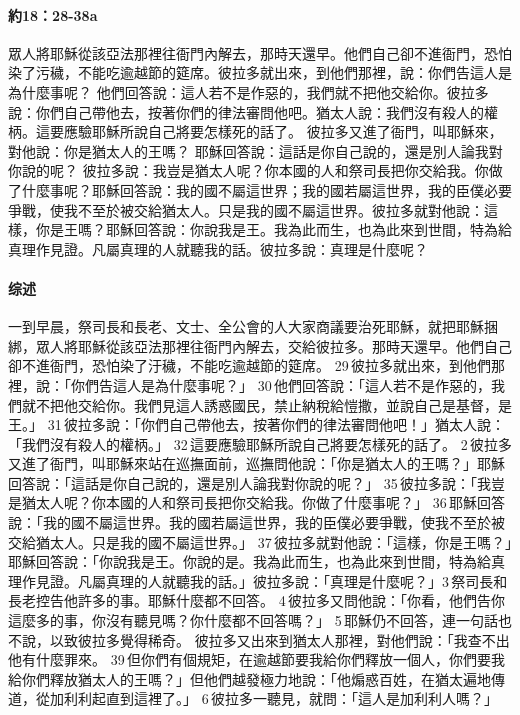 \paragraph{約18：28-38a}
眾人將耶穌從該亞法那裡往衙門內解去，那時天還早。他們自己卻不進衙門，恐怕染了污穢，不能吃逾越節的筵席。彼拉多就出來，到他們那裡，說：你們告這人是為什麼事呢？
他們回答說：這人若不是作惡的，我們就不把他交給你。彼拉多說：你們自己帶他去，按著你們的律法審問他吧。猶太人說：我們沒有殺人的權柄。這要應驗耶穌所說自己將要怎樣死的話了。
彼拉多又進了衙門，叫耶穌來，對他說：你是猶太人的王嗎？
耶穌回答說：這話是你自己說的，還是別人論我對你說的呢？
彼拉多說：我豈是猶太人呢？你本國的人和祭司長把你交給我。你做了什麼事呢？耶穌回答說：我的國不屬這世界；我的國若屬這世界，我的臣僕必要爭戰，使我不至於被交給猶太人。只是我的國不屬這世界。彼拉多就對他說：這樣，你是王嗎？耶穌回答說：你說我是王。我為此而生，也為此來到世間，特為給真理作見證。凡屬真理的人就聽我的話。彼拉多說：真理是什麼呢？
\paragraph{综述}
一到早晨，祭司長和長老、文士、全公會的人大家商議要治死耶穌，就把耶穌捆綁，眾人將耶穌從該亞法那裡往衙門內解去，交給彼拉多。那時天還早。他們自己卻不進衙門，恐怕染了汙穢，不能吃逾越節的筵席。 29 彼拉多就出來，到他們那裡，說：「你們告這人是為什麼事呢？」 30 他們回答說：「這人若不是作惡的，我們就不把他交給你。我們見這人誘惑國民，禁止納稅給愷撒，並說自己是基督，是王。」 31 彼拉多說：「你們自己帶他去，按著你們的律法審問他吧！」猶太人說：「我們沒有殺人的權柄。」 32 這要應驗耶穌所說自己將要怎樣死的話了。
 2 彼拉多又進了衙門，叫耶穌來站在巡撫面前，巡撫問他說：「你是猶太人的王嗎？」耶穌回答說：「這話是你自己說的，還是別人論我對你說的呢？」 35 彼拉多說：「我豈是猶太人呢？你本國的人和祭司長把你交給我。你做了什麼事呢？」 36 耶穌回答說：「我的國不屬這世界。我的國若屬這世界，我的臣僕必要爭戰，使我不至於被交給猶太人。只是我的國不屬這世界。」 37 彼拉多就對他說：「這樣，你是王嗎？」耶穌回答說：「你說我是王。你說的是。我為此而生，也為此來到世間，特為給真理作見證。凡屬真理的人就聽我的話。」彼拉多說：「真理是什麼呢？」3 祭司長和長老控告他許多的事。耶穌什麼都不回答。 4 彼拉多又問他說：「你看，他們告你這麼多的事，你沒有聽見嗎？你什麼都不回答嗎？」 5 耶穌仍不回答，連一句話也不說，以致彼拉多覺得稀奇。
彼拉多又出來到猶太人那裡，對他們說：「我查不出他有什麼罪來。 39 但你們有個規矩，在逾越節要我給你們釋放一個人，你們要我給你們釋放猶太人的王嗎？」但他們越發極力地說：「他煽惑百姓，在猶太遍地傳道，從加利利起直到這裡了。」 6 彼拉多一聽見，就問：「這人是加利利人嗎？」 

